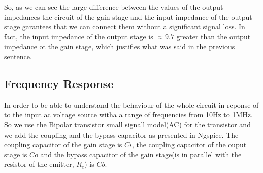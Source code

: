 So, as we can see the large difference between the values of the output impedances the circuit of
the gain stage and the input impedance of the output stage garantees that we can connect them without
a significant signal loss.
In fact, the input impedance of the output stage is $\approx 9.7$ greater than the output impedance ot the gain stage,
which justifies what was said in the previous sentence.

\subsection{Frequency Response}

In order to be able to understand the behaviour of the whole circuit in reponse of to the input ac voltage source witha
a range of frequencies from 10Hz to 1MHz.
So we use the Bipolar transistor small signall model(AC) for the transistor and we add the coupling and the bypass capacitor as presented in
Ngspice. The coupling capacitor of the gain stage is $Ci$, the coupling capacitor of the ouput stage is $Co$ and the bypass
capacitor of the gain stage(is in parallel with the resistor of the emitter, $R_e$) is $Cb$.

